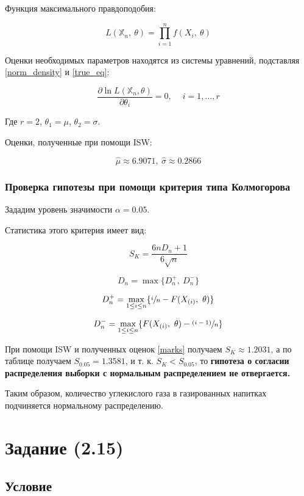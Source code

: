 \documentclass[12pt]{article}
\begin{document}
Функция максимального правдоподобия:

\begin{equation}\label{true_eq}
	L(\mathbb{X}_n,\ \theta) = \prod_{i=1}^n f(X_i,\ \theta)
\end{equation}

Оценки необходимых параметров находятся из системы уравнений, подставляя \eqref{norm_density} и \eqref{true_eq}:

$$
\frac{\partial \ln L(\mathbb{X}_n, \theta)}{\partial \theta_i} = 0,\ \quad i=1, \dots, r
$$

Где $r = 2$, $\theta_1 = \mu$, $\theta_2 = \sigma$.

Оценки, полученные при помощи ISW:

\begin{equation}\label{marks}
\hat{\mu} \approx 6.9071,\ \hat{\sigma} \approx 0.2866
\end{equation}

\subsubsection{Проверка гипотезы при помощи критерия типа Колмогорова}

Зададим уровень значимости $\alpha = 0.05$.

Статистика этого критерия имеет вид:

$$
S_{K} = \frac{6nD_n+1}{6\sqrt{n}}
$$

$$
D_n = \max\{D_n^+,\ D_n^-\}
$$

$$
D_n^+ = \max_{1\leq i \leq n}\{\sfrac{i}{n}-F(X_{(i)},\ \theta)\}
$$

$$
D_n^- = \max_{1\leq i \leq n}\{F(X_{(i)},\ \theta)-\sfrac{(i-1)}{n}\}
$$

При помощи ISW и полученных оценок \eqref{marks} получаем $S_K \approx 1.2031$, а по таблице получаем $S_{0.05} = 1.3581$, и т. к. $S_K < S_{0.05}$, то \textbf{гипотеза о согласии распределения выборки с нормальным распределением не отвергается.}

Таким образом, количество углекислого газа в газированных напитках подчиняется нормальному распределению.

\section{Задание  (2.15)}

\subsection{Условие}
\end{document}
